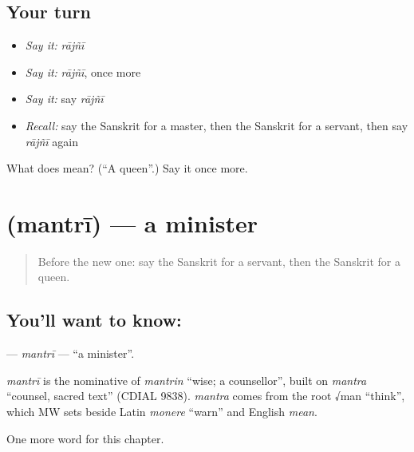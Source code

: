 \subsection*{Your turn}
\begin{itemize}
\raggedright
  \item \emph{Say it:} \emph{rājñī}
  \item \emph{Say it:} \emph{rājñī}, once more
  \item \emph{Say it:} say \emph{rājñī}
  \item \emph{Recall:} say the Sanskrit for a master, then the Sanskrit for a servant, then say \emph{rājñī} again
\end{itemize}

\begin{tcolorbox}[breakable,colback=teal!4,colframe=teal!35!black,title={Before you move on}]
What does  mean? (\textquotedblleft{}A queen\textquotedblright{}.) Say it once more.
\end{tcolorbox}
\section[\texorpdfstring{\sk{मन्त्री} (mantrī)}{मन्त्री (mantrī)}]{ (mantrī) — a minister}

\label{lesson:SA-C147-mantri}



\begin{quote}
Before the new one: say the Sanskrit for a servant, then the Sanskrit for a queen.
\end{quote}

\subsection*{You'll want to know: }
\textbf{} — \emph{mantrī} — \textquotedblleft{}a minister\textquotedblright{}.

\begin{cousinweb}
\emph{mantrī} is the nominative of \emph{mantrin} \textquotedblleft{}wise; a counsellor\textquotedblright{}, built on \emph{mantra} \textquotedblleft{}counsel, sacred text\textquotedblright{} (CDIAL 9838). \emph{mantra} comes from the root √man \textquotedblleft{}think\textquotedblright{}, which MW sets beside Latin \emph{monere} \textquotedblleft{}warn\textquotedblright{} and English \emph{mean}.
\end{cousinweb}

\begin{grammarlens}[title={What you've built}]
One more word for this chapter.
\end{grammarlens}

